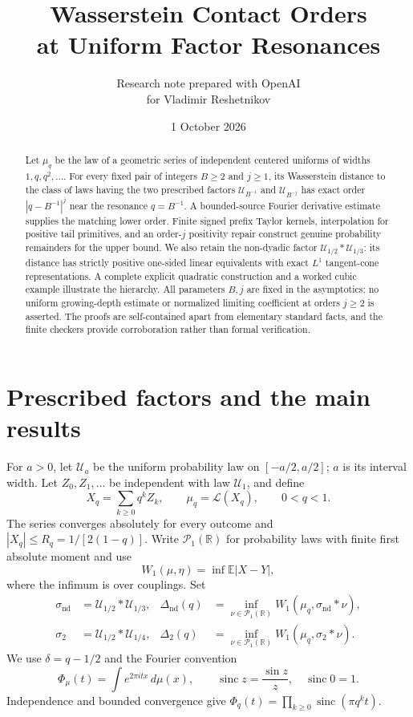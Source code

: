 \documentclass[11pt,letterpaper]{article}
\title{\bfseries Wasserstein Contact Orders\\at Uniform Factor Resonances}
\author{Research note prepared with OpenAI\\for Vladimir Reshetnikov}
\date{1 October 2026}
\theoremstyle{remark}\newtheorem{remark}[theorem]{Remark}
\newcommand{\R}{\mathbb R}\newcommand{\E}{\mathbb E}
\newcommand{\Un}{\mathcal U}\newcommand{\Law}{\mathcal L}
\newcommand{\Pone}{\mathcal P_1(\R)}
\newcommand{\sinc}{\operatorname{sinc}}
\begin{document}
\maketitle
\begin{abstract}
Let $\mu_q$ be the law of a geometric series of independent centered uniforms of widths $1,q,q^2,\ldots$. For every fixed pair of integers $B\ge2$ and $j\ge1$, its Wasserstein distance to the class of laws having the two prescribed factors $\Un_{B^{-1}}$ and $\Un_{B^{-j}}$ has exact order $|q-B^{-1}|^j$ near the resonance $q=B^{-1}$. A bounded-source Fourier derivative estimate supplies the matching lower order. Finite signed prefix Taylor kernels, interpolation for positive tail primitives, and an order-$j$ positivity repair construct genuine probability remainders for the upper bound. We also retain the non-dyadic factor $\Un_{1/2}*\Un_{1/3}$: its distance has strictly positive one-sided linear equivalents with exact $L^1$ tangent-cone representations. A complete explicit quadratic construction and a worked cubic example illustrate the hierarchy. All parameters $B,j$ are fixed in the asymptotics; no uniform growing-depth estimate or normalized limiting coefficient at orders $j\ge2$ is asserted. The proofs are self-contained apart from elementary standard facts, and the finite checkers provide corroboration rather than formal verification.
\end{abstract}

\section{Prescribed factors and the main results}\label{sec:main}

For $a>0$, let $\Un_a$ be the uniform probability law on $[-a/2,a/2]$; $a$ is its interval width. Let $Z_0,Z_1,\ldots$ be independent with law $\Un_1$, and define
\[
X_q=\sum_{k\ge0}q^kZ_k,\qquad\mu_q=\Law(X_q),\qquad0<q<1.
\]
The series converges absolutely for every outcome and $|X_q|\le R_q=1/[2(1-q)]$. Write $\Pone$ for probability laws with finite first absolute moment and use
\[
W_1(\mu,\eta)=\inf\E|X-Y|,
\]
where the infimum is over couplings. Set
\begin{align*}
\sigma_{\mathrm{nd}}&=\Un_{1/2}*\Un_{1/3},&
\Delta_{\mathrm{nd}}(q)&=\inf_{\nu\in\Pone}W_1(\mu_q,\sigma_{\mathrm{nd}}*\nu),\\
\sigma_2&=\Un_{1/2}*\Un_{1/4},&
\Delta_2(q)&=\inf_{\nu\in\Pone}W_1(\mu_q,\sigma_2*\nu).
\end{align*}
We use $\delta=q-1/2$ and the Fourier convention
\[
\Phi_\mu(t)=\int e^{2\pi itx}\,d\mu(x),\qquad\sinc z=\frac{\sin z}{z},\quad\sinc0=1.
\]
Independence and bounded convergence give $\Phi_q(t)=\prod_{k\ge0}\sinc(\pi q^kt)$.
\end{document}
